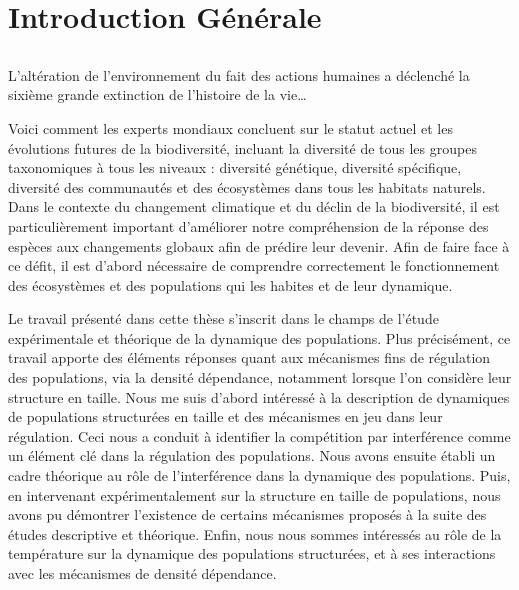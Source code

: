 \part{Introduction Générale}

\chapter*[Introduction]{}

\vspace{-5cm}

\og L'altération de l'environnement du fait des actions
humaines a déclenché la sixième grande extinction de l'histoire de la vie\ldots\fg
\autocites{stuart-chapin-iii2000a}

Voici comment les experts mondiaux concluent sur le statut actuel et les
évolutions futures de la biodiversité, incluant la diversité de tous les groupes
taxonomiques à tous les niveaux : diversité génétique, diversité spécifique,
diversité des communautés et des écosystèmes dans tous les habitats naturels.
Dans le contexte du changement climatique et du déclin de la biodiversité, il
est particulièrement important d'améliorer notre compréhension de la réponse
des espèces aux changements globaux afin de prédire leur devenir. Afin de faire
face à ce défit, il est d'abord nécessaire de comprendre correctement le
fonctionnement des écosystèmes et des populations qui les habites et de leur
dynamique. 

Le travail présenté dans cette thèse s'inscrit dans le champs de l'étude
expérimentale et théorique de la dynamique des populations. Plus précisément, ce
travail apporte des éléments réponses quant aux mécanismes fins de régulation
des populations, via la densité dépendance, notamment lorsque l'on considère
leur structure en taille.
Nous me suis d'abord intéressé à la description de dynamiques
de populations structurées en taille et des mécanismes en jeu dans leur
régulation. Ceci nous a conduit à identifier la compétition par interférence
comme un élément clé dans la régulation des populations.
Nous avons ensuite établi un cadre théorique au rôle de l'interférence dans la
dynamique des populations. Puis, en intervenant expérimentalement sur la 
structure en taille de populations, nous avons pu démontrer 
l'existence de certains mécanismes proposés à la suite des études descriptive et
théorique.
Enfin, nous nous sommes intéressés au rôle de la température sur la dynamique
des populations structurées, et à ses interactions avec les mécanismes de densité
dépendance.








